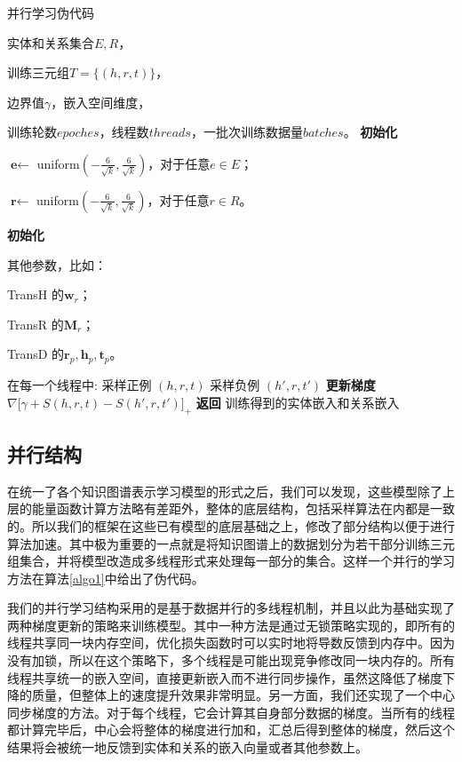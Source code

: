 \begin{algorithm}[t]
  \caption{并行学习伪代码}
  \label{algo1}
  \begin{algorithmic}[1]
        \Require 

        实体和关系集合$E, R$，

        训练三元组$T = \{(h, r, t)\}$，

        边界值$\gamma$，嵌入空间维度，

        训练轮数$epoches$，线程数$threads$，一批次训练数据量$batches$。
        \State \textbf{初始化} 

        $\textbf{e} \leftarrow $ uniform$ ( -\frac{6}{\sqrt{k}}, \frac{6}{\sqrt{k}}) $，对于任意$e \in E$；

        $\textbf{r} \leftarrow $ uniform$ ( -\frac{6}{\sqrt{k}}, \frac{6}{\sqrt{k}}) $，对于任意$r \in R$。

    \State \textbf{初始化}

    其他参数，比如：

    TransH 的$\textbf{w}_r$；

    TransR 的$\textbf{M}_r$；

    TransD 的$\textbf{r}_p, \textbf{h}_p, \textbf{t}_p$。
    
      \State 在每一个线程中:
      \State 采样正例 $(h, r, t)$
      \State 采样负例 $(h', r, t')$
      \State \textbf{更新梯度} $\nabla \big[ \gamma + S(h,r,t) - S(h', r, t') \big]_{+}$
      \EndIf
      \EndFor
      \EndFor
    \State \textbf{返回} 训练得到的实体嵌入和关系嵌入
  \end{algorithmic}
\end{algorithm}

\subsection{并行结构}

在统一了各个知识图谱表示学习模型的形式之后，我们可以发现，这些模型除了上层的能量函数计算方法略有差距外，整体的底层结构，包括采样算法在内都是一致的。所以我们的框架在这些已有模型的底层基础之上，修改了部分结构以便于进行算法加速。其中极为重要的一点就是将知识图谱上的数据划分为若干部分训练三元组集合，并将模型改造成多线程形式来处理每一部分的集合。这样一个并行的学习方法在算法\ref{algo1}中给出了伪代码。

我们的并行学习结构采用的是基于数据并行的多线程机制，并且以此为基础实现了两种梯度更新的策略来训练模型。其中一种方法是通过无锁策略实现的，即所有的线程共享同一块内存空间，优化损失函数时可以实时地将导数反馈到内存中。因为没有加锁，所以在这个策略下，多个线程是可能出现竞争修改同一块内存的。所有线程共享统一的嵌入空间，直接更新嵌入而不进行同步操作，虽然这降低了梯度下降的质量，但整体上的速度提升效果非常明显。另一方面，我们还实现了一个中心同步梯度的方法。对于每个线程，它会计算其自身部分数据的梯度。当所有的线程都计算完毕后，中心会将整体的梯度进行加和，汇总后得到整体的梯度，然后这个结果将会被统一地反馈到实体和关系的嵌入向量或者其他参数上。

